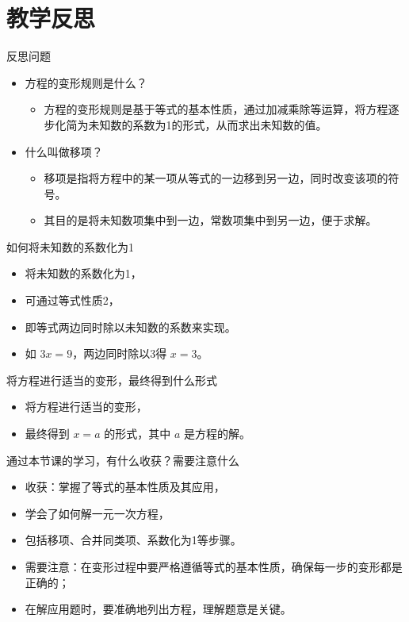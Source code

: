 \documentclass{ctexbeamer}
\begin{document}
\section{教学反思}

\begin{frame}{反思问题}
  \begin{itemize}
    \item 方程的变形规则是什么？
      \begin{itemize}
        \item 方程的变形规则是基于等式的基本性质，通过加减乘除等运算，将方程逐步化简为未知数的系数为1的形式，从而求出未知数的值。
      \end{itemize}
    \item 什么叫做移项？
      \begin{itemize}
        \item 移项是指将方程中的某一项从等式的一边移到另一边，同时改变该项的符号。
        \item 其目的是将未知数项集中到一边，常数项集中到另一边，便于求解。
      \end{itemize}
  \end{itemize}
\end{frame}

\begin{frame}{如何将未知数的系数化为1}
  \begin{itemize}
    \item 将未知数的系数化为1，
    \item 可通过等式性质2，
    \item 即等式两边同时除以未知数的系数来实现。
    \item 如 \(3x = 9\)，两边同时除以3得 \(x = 3\)。
  \end{itemize}
\end{frame}

\begin{frame}{将方程进行适当的变形，最终得到什么形式}
  \begin{itemize}
    \item 将方程进行适当的变形，
    \item 最终得到 \(x = a\) 的形式，其中 \(a\) 是方程的解。
  \end{itemize}
\end{frame}

\begin{frame}{通过本节课的学习，有什么收获？需要注意什么}
  \begin{itemize}
    \item 收获：掌握了等式的基本性质及其应用，
    \item 学会了如何解一元一次方程，
    \item 包括移项、合并同类项、系数化为1等步骤。
    \item 需要注意：在变形过程中要严格遵循等式的基本性质，确保每一步的变形都是正确的；
    \item 在解应用题时，要准确地列出方程，理解题意是关键。
  \end{itemize}
\end{frame}
\end{document}

